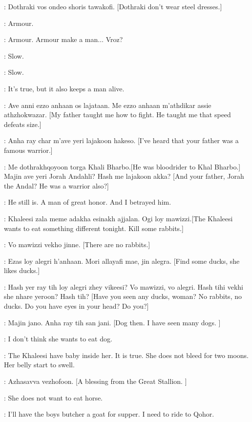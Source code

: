 \RAKHARO: Dothraki vos ondeo shoris tawakofi. [Dothraki don't wear steel dresses.]

\JORAH: Armour. 

\RAKHARO: Armour. Armour make a man$\ldots$ Vroz? 

\JORAH: Slow. 

\RAKHARO: Slow. 

\JORAH: It's true, but it also keeps a man alive. 

\RAKHARO: Ave anni ezzo anhaan os lajataan. Me ezzo anhaan m'athdikar assie athzhokwazar. [My father taught me how to fight. He taught me that speed defeats size.]

\JORAH:  Anha ray char m'ave yeri lajakoon hakeso. [I've heard that your father was a famous warrior.]

\RAKHARO: Me dothrakhqoyoon torga Khali Bharbo.[He was bloodrider to Khal Bharbo.] Majin ave yeri Jorah Andahli? Hash me lajakoon akka?  [And your father, Jorah the Andal? He was a warrior also?]

\JORAH: He still is. A man of great honor. And I betrayed him. 


\IRRI:  Khaleesi zala meme adakha esinakh ajjalan. Ogi loy mawizzi.[The Khaleesi wants to eat something different tonight. Kill some rabbits.]

\RAKHARO: Vo mawizzi vekho jinne. [There are no rabbits.]

\IRRI: Ezas loy alegri h'anhaan. Mori allayafi mae, jin alegra. [Find some ducks, she likes ducks.]

\RAKHARO:  Hash yer ray tih loy alegri zhey vikeesi? Vo mawizzi, vo alegri. Hash tihi vekhi she nhare yeroon? Hash tih? [Have you seen any ducks, woman? No rabbits, no ducks. Do you have eyes in your head? Do you?] 

\IRRI: Majin jano. Anha ray tih san jani. [Dog then. I have seen many dogs. ]

\JORAH: I don't think she wants to eat dog. 

\IRRI: The Khaleesi have baby inside her. It is true. She does not bleed for two moons. Her belly start to swell. 

\RAKHARO: Azhasavva vezhofoon. [A blessing from the Great Stallion. ]

\IRRI: She does not want to eat horse. 

\JORAH: I'll have the boys butcher a goat for supper. I need to ride to Qohor. 

